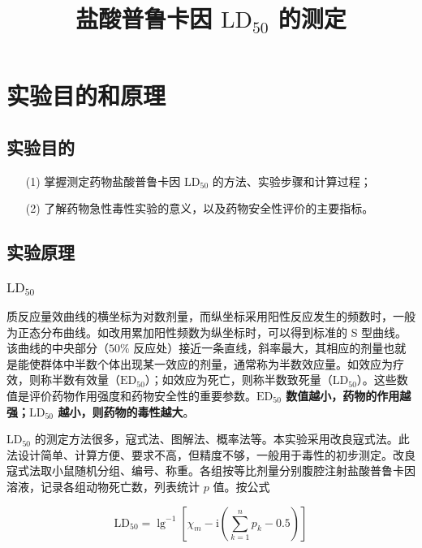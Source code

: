 \documentclass[UTF8]{ctexart}
\title{盐酸普鲁卡因 $\text{LD}_{50}$ 的测定}
\author{}
\begin{document}
\date{}
\maketitle

\section{实验目的和原理}

\subsection{实验目的}

\begin{itemize}
    \item [(1)] 掌握测定药物盐酸普鲁卡因 $\text{LD}_{50}$ 的方法、实验步骤和计算过程；
    \item [(2)] 了解药物急性毒性实验的意义，以及药物安全性评价的主要指标。
\end{itemize}

\subsection{实验原理}

\subsubsection{$\text{LD}_{50}$}

质反应量效曲线的横坐标为对数剂量，而纵坐标采用阳性反应发生的频数时，一般为正态分布曲线。如改用累加阳性频数为纵坐标时，可以得到标准的 S 型曲线。该曲线的中央部分（$50\%$ 反应处）接近一条直线，斜率最大，其相应的剂量也就是能使群体中半数个体出现某一效应的剂量，通常称为半数效应量。如效应为疗效，则称半数有效量（$\text{ED}_{50}$）；如效应为死亡，则称半数致死量（$\text{LD}_{50}$）。这些数值是评价药物作用强度和药物安全性的重要参数。\textbf{$\text{ED}_{50}$ 数值越小，药物的作用越强；$\text{LD}_{50}$ 越小，则药物的毒性越大}。

$\text{LD}_{50}$ 的测定方法很多，寇式法、图解法、概率法等。本实验采用改良寇式法。此法设计简单、计算方便、要求不高，但精度不够，一般用于毒性的初步测定。改良寇式法取小鼠随机分组、编号、称重。各组按等比剂量分别腹腔注射盐酸普鲁卡因溶液，记录各组动物死亡数，列表统计 $p$ 值。按公式

$$
    \text{LD}_{50}=\lg^{-1}\left[\chi_m-\mathrm{i}\left(\sum_{k=1}^np_k-0.5\right)\right]
$$
\end{document}
